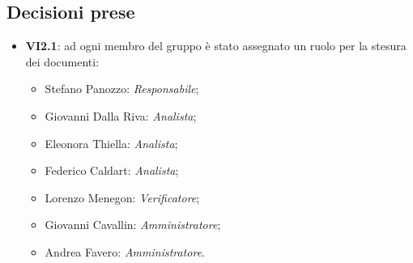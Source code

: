 	\subsection{Decisioni prese}
		\begin{itemize}
			\item \textbf{VI2.1}: ad ogni membro del gruppo è stato assegnato un ruolo per la stesura dei documenti:
			\begin{itemize}
				\item Stefano Panozzo: \emph{Responsabile};
				\item Giovanni Dalla Riva: \emph{Analista};
				\item Eleonora Thiella: \emph{Analista};
				\item Federico Caldart: \emph{Analista};
				\item Lorenzo Menegon: \emph{Verificatore};
				\item Giovanni Cavallin: \emph{Amministratore};
				\item Andrea Favero: \emph{Amministratore}.
			\end{itemize}
		\end{itemize}
